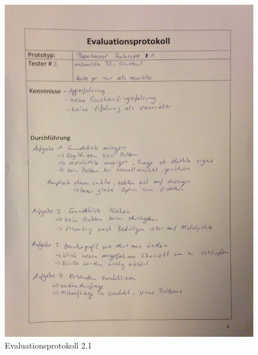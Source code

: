 \begin{figure}[H]
\includegraphics[width=1\textwidth]{./images/evaluation/eva21.JPG}
\caption{Evaluationsprotokoll 2.1}
\label{fig:evaluation21}
\end{figure}

